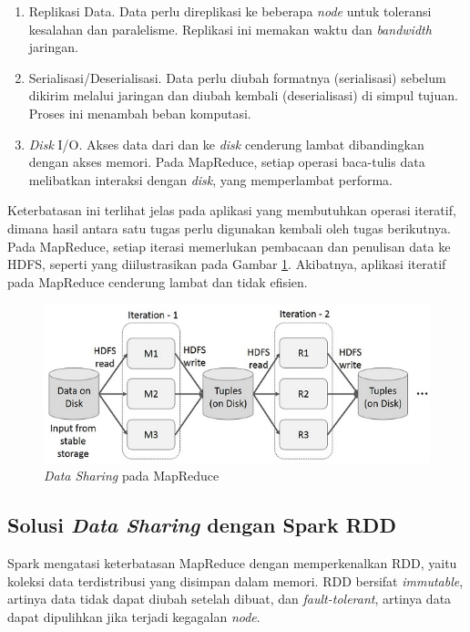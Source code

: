 \begin{enumerate}
    \item Replikasi Data. Data perlu direplikasi ke beberapa \textit{node} untuk toleransi kesalahan dan paralelisme. Replikasi ini memakan waktu dan \textit{bandwidth} jaringan.
    \item Serialisasi/Deserialisasi. Data perlu diubah formatnya (serialisasi) sebelum dikirim melalui jaringan dan diubah kembali (deserialisasi) di simpul tujuan. Proses ini menambah beban komputasi.
    \item \textit{Disk} I/O. Akses data dari dan ke \textit{disk} cenderung lambat dibandingkan dengan akses memori. Pada MapReduce, setiap operasi baca-tulis data melibatkan interaksi dengan \textit{disk}, yang memperlambat performa.
\end{enumerate}

Keterbatasan ini terlihat jelas pada aplikasi yang membutuhkan operasi iteratif, dimana hasil antara satu tugas perlu digunakan kembali oleh tugas berikutnya. Pada MapReduce, setiap iterasi memerlukan pembacaan dan penulisan data ke HDFS, seperti yang diilustrasikan pada Gambar \ref{fig:iterative_operations_on_mapreduce}. Akibatnya, aplikasi iteratif pada MapReduce cenderung lambat dan tidak efisien.

\begin{figure}[h]
    \centering
    \includegraphics[width=1\textwidth]{figures/ch02/iterative_operations_on_mapreduce}
    \caption{\textit{Data Sharing} pada MapReduce \cite{ApacheSparkIntroduction}}
    \label{fig:iterative_operations_on_mapreduce}
\end{figure}

\subsection{Solusi \textit{Data Sharing} dengan Spark RDD}

Spark mengatasi keterbatasan MapReduce dengan memperkenalkan RDD, yaitu koleksi data terdistribusi yang disimpan dalam memori. RDD bersifat \textit{immutable}, artinya data tidak dapat diubah setelah dibuat, dan \textit{fault-tolerant}, artinya data dapat dipulihkan jika terjadi kegagalan \textit{node}.

